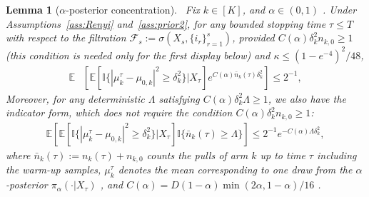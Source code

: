\documentclass[10pt,a4paper]{amsart}
\newtheorem{lemma}{Lemma}
\def\bbE{\mathbb E}
\def\ind{\mathbb{I}}
\begin{document}
        \begin{lemma}[$\alpha$-posterior concentration]~\label{lem:Post}
            Fix {$k\in [K]$,} and $\alpha\in(0,1)$ . Under  Assumptions~\ref{ass:Renyi} and~\ref{ass:prior2}, for  any bounded stopping time $\tau \leq T$ with respect to the filtration $\mathcal{F}_s := \sigma\left(X_s, \{i_r\}_{r=1}^s\right)$, provided $C(\alpha)\delta_k^2 n_{k,0} \geq 1$ (this condition is needed only for the first display below)  and $\kappa \leq (1-e^{-4})^2/48$, 
            \begin{align}
                \bbE& \left[ \bbE\left[ \ind\{|\mu_k^{\tau} -\mu_{0,k} |^2 \geq \delta_k^2 \} | X_{\tau} \right] e^{C(\alpha) \bar n_k(\tau) \delta_k^2} \right] 
                \leq 2^{-1},
                \label{eq:postcon}
            \end{align}
            Moreover, for any deterministic $\Lambda$ satisfying $C(\alpha)\delta_k^2 \Lambda \geq 1$, we also have the indicator form, which does \emph{not} require the condition $C(\alpha)\delta_k^2 n_{k,0} \geq 1$:
            \begin{align}
                \bbE \left[ \bbE\left[ \ind\{|\mu_k^{\tau} -\mu_{0,k} |^2 \geq \delta_k^2 \} | X_{\tau} \right] \ind\{\bar n_k(\tau) \geq \Lambda\} \right] 
                \leq 2^{-1} e^{ - C(\alpha) \Lambda \delta_k^2 },
                \label{eq:postconL}
            \end{align}
            where $\bar n_k(\tau) := n_k(\tau)+n_{k,0}$ counts the pulls of arm $k$ up to time $\tau$ including the warm-up samples, $\mu_k^{\tau}$ denotes the mean corresponding to one draw from the $\alpha$-posterior $\pi_{\alpha}(\cdot|X_{\tau})$ %
            , and $C(\alpha) = D (1-\alpha) \min \left(2\alpha,1-\alpha  \right)/16$ .
        \end{lemma}
\end{document}
